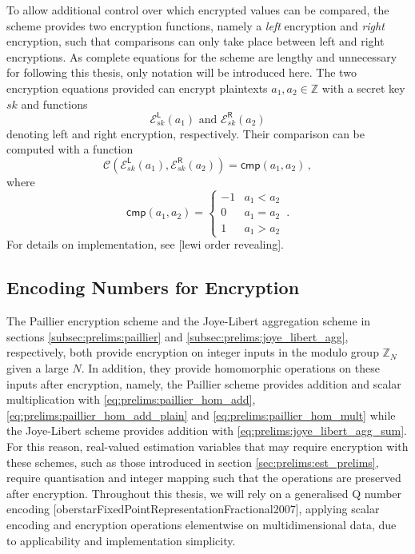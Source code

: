 To allow additional control over which encrypted values can be compared, the scheme provides two encryption functions, namely a \textit{left} encryption and \textit{right} encryption, such that comparisons can only take place between left and right encryptions. As complete equations for the scheme are lengthy and unnecessary for following this thesis, only notation will be introduced here. The two encryption equations provided can encrypt plaintexts $a_1,a_2\in\mathbb{Z}$ with a secret key $sk$ and functions
\begin{equation}\label{eq:prelims:lewi_enc}
    \mathcal{E}^{\mathsf{L}}_{sk}\left(a_1\right)\text{ and }\mathcal{E}^{\mathsf{R}}_{sk}\left(a_2\right)
\end{equation}
denoting left and right encryption, respectively. Their comparison can be computed with a function
\begin{equation}\label{eq:prelims:lewi_comp}
    \mathcal{C}\left(\mathcal{E}^{\mathsf{L}}_{sk}(a_1), \mathcal{E}^{\mathsf{R}}_{sk}(a_2)\right) = \mathsf{cmp}(a_1, a_2)\,,
\end{equation}
where
\begin{equation*}
    \mathsf{cmp}(a_1, a_2)=
    \begin{cases}
        -1 & a_1 < a_2\\
        0 & a_1 = a_2\\
        1 & a_1 > a_2
    \end{cases}\,.
\end{equation*}
For details on implementation, see [lewi order revealing].

% 
% 

\subsection{Encoding Numbers for Encryption}\label{subsec:prelims:encoding}
The Paillier encryption scheme and the Joye-Libert aggregation scheme in sections \ref{subsec:prelims:paillier} and \ref{subsec:prelims:joye_libert_agg}, respectively, both provide encryption on integer inputs in the modulo group $\mathbb{Z}_N$ given a large $N$. In addition, they provide homomorphic operations on these inputs after encryption, namely, the Paillier scheme provides addition and scalar multiplication with \eqref{eq:prelims:paillier_hom_add}, \eqref{eq:prelims:paillier_hom_add_plain} and \eqref{eq:prelims:paillier_hom_mult} while the Joye-Libert scheme provides addition with \eqref{eq:prelims:joye_libert_agg_sum}. For this reason, real-valued estimation variables that may require encryption with these schemes, such as those introduced in section \ref{sec:prelims:est_prelims}, require quantisation and integer mapping such that the operations are preserved after encryption. Throughout this thesis, we will rely on a generalised Q number encoding [oberstarFixedPointRepresentationFractional2007], applying scalar encoding and encryption operations elementwise on multidimensional data, due to applicability and implementation simplicity.

